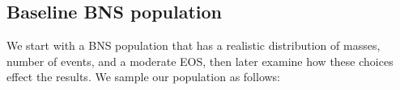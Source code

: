 \documentclass[twocolumn,prd,amssymb,aps,nofootinbib,showpacs,epsf]{revtex4}
\newcommand\ben[2]{\textcolor{red}{{#1}\sout{#2}}}
\newcommand\les[2]{\textcolor{blue}{{#1}\sout{#2}}}
\begin{document}


\subsection{Baseline BNS population}
\label{sec:baseline}

We start with a BNS population that has a realistic distribution of masses, number of events, and a moderate EOS, then later examine how these choices effect the results. We sample our population as follows:
\end{document}
